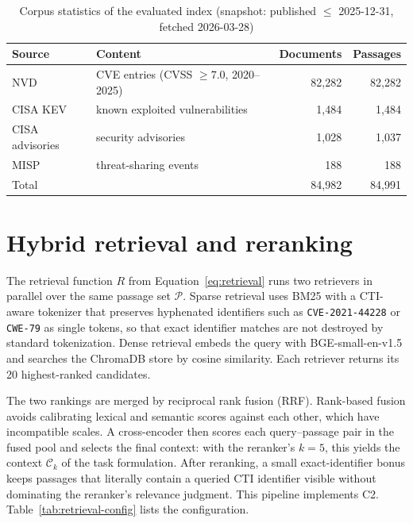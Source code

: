\begin{table}[H]
    \centering
    \small
    \begin{tabular}{llrr}
        \toprule
        \textbf{Source} & \textbf{Content} & \textbf{Documents} & \textbf{Passages} \\
        \midrule
        NVD & CVE entries (CVSS $\geq 7.0$, 2020--2025) & 82{,}282 & 82{,}282 \\
        CISA KEV & known exploited vulnerabilities & 1{,}484 & 1{,}484 \\
        CISA advisories & security advisories & 1{,}028 & 1{,}037 \\
        MISP & threat-sharing events & 188 & 188 \\
        \midrule
        Total & & 84{,}982 & 84{,}991 \\
        \bottomrule
    \end{tabular}
    \caption{Corpus statistics of the evaluated index (snapshot: published
             $\leq$ 2025-12-31, fetched 2026-03-28)}
    \label{tab:corpus-stats}
\end{table}

\section{Hybrid retrieval and reranking}
\label{sec:retrieval}

The retrieval function $R$ from Equation~\ref{eq:retrieval} runs two
retrievers in parallel over the same passage set $\mathcal{P}$. Sparse
retrieval uses BM25 with a CTI-aware tokenizer that preserves hyphenated
identifiers such as \texttt{CVE-2021-44228} or \texttt{CWE-79} as single
tokens, so that exact identifier matches are not destroyed by standard
tokenization. Dense retrieval embeds the query with BGE-small-en-v1.5 and
searches the ChromaDB store by cosine similarity. Each retriever returns
its 20 highest-ranked candidates.

The two rankings are merged by reciprocal rank fusion (RRF). Rank-based fusion
avoids calibrating lexical and semantic scores against each other, which
have incompatible scales. A cross-encoder then scores each query--passage
pair in the fused pool and selects the final context: with the reranker's
$k = 5$, this yields the context $\mathcal{C}_k$ of the task formulation.
After reranking, a small exact-identifier bonus keeps passages that
literally contain a queried CTI identifier visible without dominating the
reranker's relevance judgment. This pipeline implements C2.
Table~\ref{tab:retrieval-config} lists the configuration.

